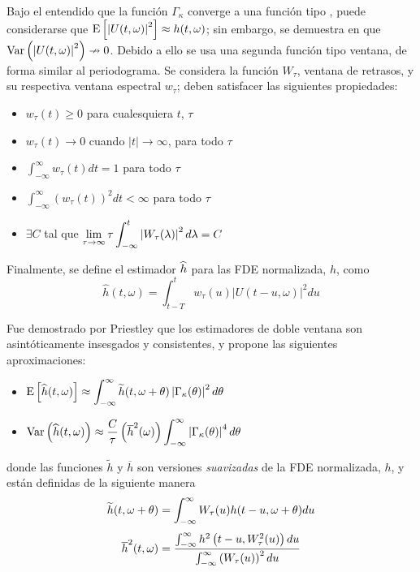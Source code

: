 Bajo el entendido que la función $\Gamma_\kappa$ converge a una función tipo \dirac, puede 
considerarse que 
$\mathrm{E}\left[ \left| U(t,\omega) \right|^{2} \right] \approx h(t,\omega)$; sin embargo, se demuestra en \cite{Priestley66} 
que $\mathrm{Var}\left( \left| U(t,\omega) \right|^{2} \right) \nrightarrow 0$.
%
Debido a ello se usa una segunda función tipo ventana,
de forma similar al periodograma.
Se considera la función $W_\tau$, ventana de retrasos, y su respectiva ventana espectral 
$w_\tau$; deben satisfacer las siguientes propiedades:
\begin{itemize}
\item $w_{\tau}(t) \geq 0$ para cualesquiera $t$, $\tau$
\item $w_{\tau}(t) \rightarrow 0$ cuando $\lvert t \lvert \rightarrow \infty$, para todo $\tau$
\item $\displaystyle \int_{-\infty}^{\infty} w_{\tau}(t) dt = 1$ para todo $\tau$
\item $\displaystyle \int_{-\infty}^{\infty} \left( w_{\tau}(t) \right)^{2} dt < \infty$ para todo $\tau$
\item $\exists C$ tal que  
$\displaystyle \lim_{\tau\rightarrow\infty} \tau \int_{-\infty}^{t} \left|  W_{\tau}(\lambda)  \right|^{2} d\lambda = C$
\end{itemize}

Finalmente, se define el estimador $\widehat{ h }$ para las FDE normalizada, $h$, como
\begin{equation*}
\widehat{h}(t,\omega) = \int_{t-T}^{t} w_{\tau}(u) \lvert U(t-u,\omega) \lvert^{2} du
\label{estimador_doble_ventana}
\end{equation*}

Fue demostrado por Priestley \cite{Priestley65} que los estimadores de doble ventana son 
asintóticamente insesgados y consistentes, y propone las siguientes aproximaciones:
\begin{itemize}
\item $\displaystyle
\mathrm{E}\left[ \widehat{ h }(t,\omega) \right] \approx 
\int_{-\infty}^{\infty} \widetilde{h}(t,\omega+\theta) \left| \Gamma_\kappa(\theta) \right|^{2} d\theta$
\item $\displaystyle
\mathrm{Var}\left( \widehat{ h }(t,\omega) \right) \approx \frac{C}{\tau} \left( \overline{h}^{2}(\omega) \right)
\int_{-\infty}^{\infty} \left| \Gamma_\kappa(\theta) \right|^{4} d\theta $
\end{itemize}

donde las funciones $\widetilde{h}$ y $\overline{h}$ son versiones \textit{suavizadas} de la FDE 
normalizada, $h$, y están definidas de la siguiente manera
\begin{equation*}
\widetilde{h}(t,\omega+\theta) = 
\int_{-\infty}^{\infty} W_{\tau}(u) h(t-u,\omega+\theta) du
\end{equation*}
\begin{equation*}
\overline{h}^{2} (t,\omega) =
\frac{\int_{-\infty}^{\infty} h^{2}\left(t-u,W_{\tau}^{2}(u)\right) du}
{\int_{-\infty}^{\infty} \left( W_{\tau}(u) \right)^{2} du}
\end{equation*}

